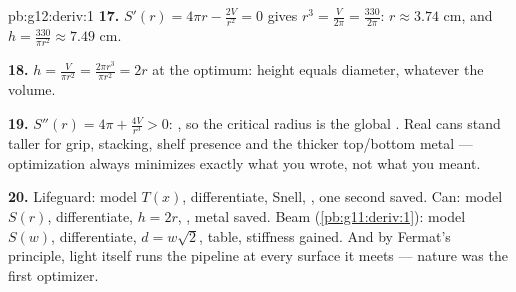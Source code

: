 \begin{solution}{pb:g12:deriv:1}
\textbf{17.} $S'(r) = 4\pi r - \frac{2V}{r^2} = 0$ gives
$r^3 = \frac{V}{2\pi} = \frac{330}{2\pi}$:
$r \approx 3.74$ cm, and
$h = \frac{330}{\pi r^2} \approx 7.49$ cm.

\textbf{18.} $h = \frac{V}{\pi r^2} = \frac{2\pi r^3}{\pi r^2}
= 2r$ at the optimum: height equals diameter, whatever the
volume.

\textbf{19.} $S''(r) = 4\pi + \frac{4V}{r^3} > 0$: , so
the critical radius is the global . Real cans stand
taller for grip, stacking, shelf presence and the thicker
top/bottom metal --- optimization always minimizes exactly
what you wrote, not what you meant.

\textbf{20.} Lifeguard: model $T(x)$, differentiate, Snell,
, one second saved. Can: model $S(r)$, differentiate,
$h = 2r$, , metal saved. Beam
(\cref{pb:g11:deriv:1}): model $S(w)$, differentiate,
$d = w\sqrt2$, table, stiffness gained. And by Fermat's
principle, light itself runs the pipeline at every surface it
meets --- nature was the first optimizer.
\end{solution}
